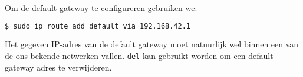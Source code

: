 Om de default gateway te configureren gebruiken we:
\begin{lstlisting}[language=bash]
$ sudo ip route add default via 192.168.42.1
\end{lstlisting}
Het gegeven IP-adres van de default gateway moet natuurlijk wel binnen een van de ons bekende netwerken vallen. \texttt{del} kan gebruikt worden om een default gateway adres te verwijderen.
